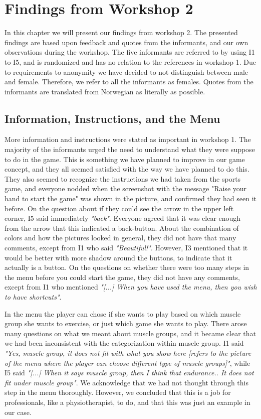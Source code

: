 \chapter{Findings from Workshop 2}

In this chapter we will present our findings from workshop 2. The presented findings are based upon feedback and quotes from the informants, and our own observations during the workshop. The five informants are referred to by using I1 to I5, and is randomized and has no relation to the references in workshop 1. Due to requirements to anonymity we have decided to not distinguish between male and female. Therefore, we refer to all the informants as females. Quotes from the informants are translated from Norwegian as literally as possible. 

\section{Information, Instructions, and the Menu}

More information and instructions were stated as important in workshop 1. The majority of the informants urged the need to understand what they were suppose to do in the game. This is something we have planned to improve in our game concept, and they all seemed satisfied with the way we have planned to do this. They also seemed to recognize the instructions we had taken from the sports game, and everyone nodded  when the screenshot with the message "Raise your hand to start the game" was shown in the picture, and confirmed they had seen it before. On the question about if they could see the arrow in the upper left corner, I5 said immediately \emph{"back"}. Everyone agreed that it was clear enough from the arrow that this indicated a back-button. About the combination of colors and how the pictures looked in general, they did not have that many comments, except from I1 who said \emph{"Beautiful!"}.  However, I3 mentioned that it would be better with more shadow around the buttons, to indicate that it actually is a button. On the questions on whether there were too many steps in the menu before you could start the game, they did not have any comments, except from I1 who mentioned \emph{"[...] When you have used the menu, then you wish to have shortcuts"}. 

In the menu the player can chose if she wants to play based on which muscle group she wants to exercise, or just which game she wants to play. There arose many questions on what we meant about muscle groups, and it became clear that we had been inconsistent with the categorization within muscle group. I1 said \emph{"Yes, muscle group, it does not fit with what you show here [refers to the picture of the menu where the player can choose different type of muscle groups]"}, while I5 said \emph{"[...] When it says muscle group, then I think that endurance.. It does not fit under muscle group"}. We acknowledge that we had not thought through this step in the menu thoroughly. However, we concluded that this is a job for professionals, like a physiotherapist, to do, and that this was just an example in our case.  

